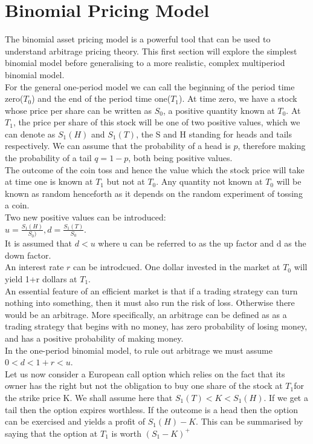 \documentclass[12pt]{article}
\begin{document}
\section{Binomial Pricing Model}
The binomial asset pricing model is a powerful tool that can be used to
understand arbitrage pricing theory. This first section will explore the
simplest binomial model before generalising to a more realistic, complex
multiperiod binomial model. 
\\
For the general one-period model we can call the beginning of the period time
zero($T_{0}$) and the end of the period time one($T_1$). At time zero, we have a
stock whose price per share can be written as $S_0$, a positive quantity known
at $T_0$. At $T_1$, the price per share of this stock will be one of two
positive values, which we can denote as $S_1(H)$ and $S_1(T)$, the S and H
standing for heads and tails respectively. We can assume that the probability of
a head is $p$, therefore making the probability of a tail $q = 1-p$, both being
positive values. 
\\
The outcome of the coin toss and hence the value which the stock price will take
at time one is known at $T_1$ but not at $T_0$. Any quantity not known at $T_0$
will be known as random henceforth as it depends on the random experiment of
tossing a coin. \\
Two new positive values can be introduced: \\
$u = \frac{S_1(H)}{S_0)},  d = \frac{S_1(T)}{S_0}$.
\\ It is assumed that $d<u$ where u can be referred to as the up factor and d as
the down factor.
\\
An interest rate $r$ can be introdcued. One dollar invested in the market at
$T_0$ will yield 1+r dollars at $T_1$. 
\\
An essential feature of an efficient market is that if a trading strategy can
turn nothing into something, then it must also run the risk of loss. Otherwise
there would be an arbitrage. More specifically, an arbitrage can be defined as
as a trading strategy that begins with no money, has zero probability of losing
money, and has a positive probability of making money. 
\\
In the one-period binomial model, to rule out arbitrage we must assume
$0<d<1+r<u$.
\\
Let us now consider a European call option which relies on the fact that its
owner has the right but not the obligation to buy one share of the stock at 
$T_1$for the strike price K. We shall assume here that $S_1(T)<K<S_1(H)$. If we
get a tail then the option expires worthless. If the outcome is a head then the
option can be exercised and yields a profit of $S_1(H) - K$. This can be
summarised by saying that the option at $T_1$ is worth $(S_1 - K)^+$
\end{document}
